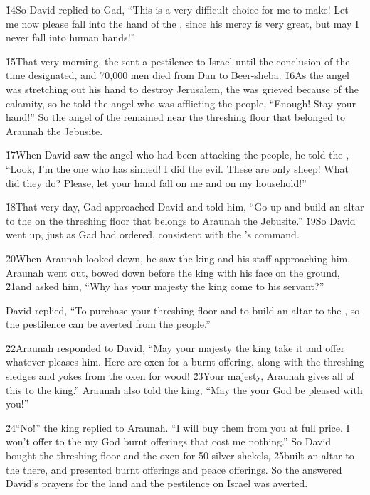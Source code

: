 \v{14}So David replied to Gad, ``This is a very difficult choice for me to make! Let me now please fall into the hand of the , since his mercy is very great, but may I never fall into human hands!''

\v{15}That very morning, the  sent a pestilence to Israel until the conclusion of the time designated, and 70,000 men died from Dan to Beer-sheba. \v{16}As the angel was stretching out his hand to destroy Jerusalem, the  was grieved because of the calamity, so he told the angel who was afflicting the people, ``Enough! Stay your hand!'' So the angel of the  remained near the threshing floor that belonged to Araunah the Jebusite.

\v{17}When David saw the angel who had been attacking the people, he told the , ``Look, I'm the one who has sinned! I did the evil. These are only sheep! What did they do? Please, let your hand fall on me and on my household!''

\v{18}That very day, Gad approached David and told him, ``Go up and build an altar to the  on the threshing floor that belongs to Araunah the Jebusite.'' \v{19}So David went up, just as Gad had ordered, consistent with the 's command.

\v{20}When Araunah looked down, he saw the king and his staff approaching him. Araunah went out, bowed down before the king with his face on the ground, \v{21}and asked him, ``Why has your majesty the king come to his servant?''

David replied, ``To purchase your threshing floor and to build an altar to the , so the pestilence can be averted from the people.''

\v{22}Araunah responded to David, ``May your majesty the king take it and offer whatever pleases him. Here are oxen for a burnt offering, along with the threshing sledges and yokes from the oxen for wood! \v{23}Your majesty, Araunah gives all of this to the king.'' Araunah also told the king, ``May the  your God be pleased with you!''

\v{24}``No!'' the king replied to Araunah. ``I will buy them from you at full price. I won't offer to the  my God burnt offerings that cost me nothing.'' So David bought the threshing floor and the oxen for 50 silver shekels, \v{25}built an altar to the  there, and presented burnt offerings and peace offerings. So the  answered David's prayers for the land and the pestilence on Israel was averted.
